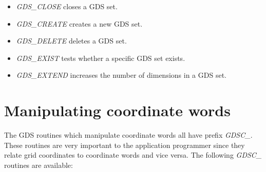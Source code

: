 \begin{itemize}

\item {\sl GDS\_CLOSE\/} closes a GDS set.

\item {\sl GDS\_CREATE\/} creates a new GDS
set.

\item {\sl GDS\_DELETE\/} deletes a GDS set.

\item {\sl GDS\_EXIST\/} tests whether a
specific GDS set exists.

\item {\sl GDS\_EXTEND\/} increases the number
of dimensions in a GDS set.

\end{itemize}

\section{Manipulating coordinate words}

The GDS routines which manipulate coordinate words all have prefix {\sl
GDSC\_\/}.  These routines are very important to the application
programmer since they relate grid coordinates to coordinate words and
vice versa.  The following {\sl GDSC\_\/} routines are available:

